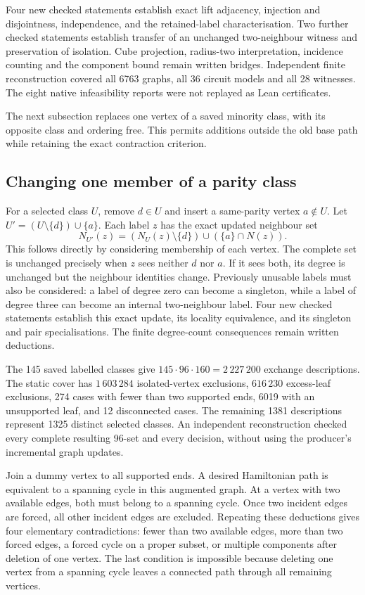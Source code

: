 \documentclass[11pt,a4paper]{article}
\theoremstyle{definition}
\theoremstyle{remark}
\begin{document}
Four new checked statements establish exact lift adjacency, injection
and disjointness, independence, and the retained-label characterisation.
Two further checked statements establish transfer of an unchanged
two-neighbour witness and preservation of isolation. Cube projection,
radius-two interpretation, incidence counting and the component bound
remain written bridges. Independent finite reconstruction covered all
6763 graphs, all 36 circuit models and all 28 witnesses. The eight native
infeasibility reports were not replayed as Lean certificates.

The next subsection replaces one vertex of a saved minority class,
with its opposite class and ordering free. This permits additions
outside the old base path while retaining the exact contraction criterion.

\subsection{Changing one member of a parity class}
\label{sec:exchange234}
For a selected class $U$, remove $d\in U$ and insert a same-parity
vertex $a\notin U$. Let $U'=(U\setminus\{d\})\cup\{a\}$. Each label $z$
has the exact updated neighbour set
\[
 N_{U'}(z)=(N_U(z)\setminus\{d\})\cup(\{a\}\cap N(z)).
\]
This follows directly by considering membership of each vertex. The
complete set is unchanged precisely when $z$ sees neither $d$ nor $a$.
If it sees both, its degree is unchanged but the neighbour identities
change. Previously unusable labels must also be considered: a label
of degree zero can become a singleton, while a label of degree three
can become an internal two-neighbour label. Four new checked statements
establish this exact update, its locality equivalence, and its singleton
and pair specialisations. The finite degree-count consequences remain
written deductions.

The 145 saved labelled classes give
$145\cdot96\cdot160=2\,227\,200$ exchange descriptions. The static cover
has $1\,603\,284$ isolated-vertex exclusions, $616\,230$ excess-leaf
exclusions, 274 cases with fewer than two supported ends, 6019 with an
unsupported leaf, and 12 disconnected cases. The remaining 1381
descriptions represent 1325 distinct selected classes. An independent
reconstruction checked every complete resulting 96-set and every
decision, without using the producer's incremental graph updates.

Join a dummy vertex to all supported ends. A desired Hamiltonian path
is equivalent to a spanning cycle in this augmented graph. At a vertex
with two available edges, both must belong to a spanning cycle. Once
two incident edges are forced, all other incident edges are excluded.
Repeating these deductions gives four elementary contradictions: fewer
than two available edges, more than two forced edges, a forced cycle
on a proper subset, or multiple components after deletion of one vertex.
The last condition is impossible because deleting one vertex from a
spanning cycle leaves a connected path through all remaining vertices.
\end{document}
